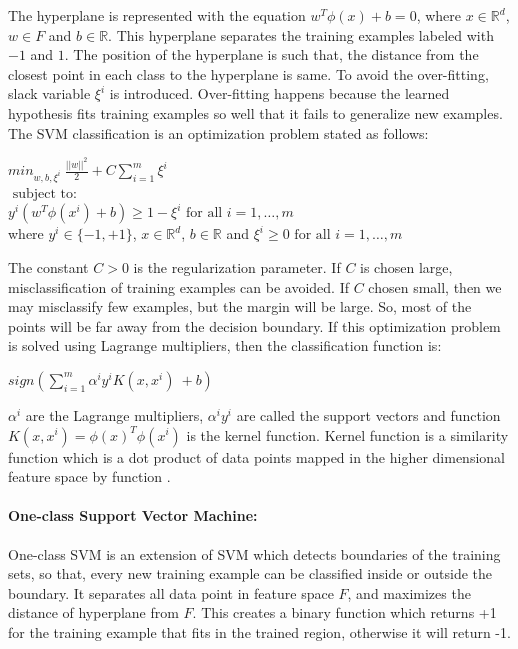 \documentclass[12pt,oneside,a4paper]{article}
\begin{document}
The hyperplane is represented with the equation $w^{T} \phi(x) + b = 0$, where $x \in \mathbb{R}^d$, $w \in F$ and $b \in \mathbb{R}$. This hyperplane separates the training examples labeled with $-1$ and $1$. The position of the hyperplane is such that, the distance from the closest point in each class to the hyperplane is same. To avoid the over-fitting, slack variable $\xi^{i}$ is introduced. Over-fitting happens because the learned hypothesis fits training examples so well that it fails to generalize new examples. The SVM classification is an optimization problem stated as follows:\cite{svm} \cite{svm-ml}

\begin{center}
  ${min}_{w,b,\xi^i} \ \frac{||w||^2}{2} + C \sum_{i=1}^m \xi^i$ \\
  $\mbox{ subject to: }$ \\
  $y^i( w^T \phi(x^i) + b) \geq 1 - \xi^i \mbox{ for all } i = 1, \dots, m$ \\
  where $y^{i} \in \{-1, +1\}$, $x \in \mathbb{R}^d$, $b \in \mathbb{R}$ and $\xi^i \geq 0 \mbox{ for all } i = 1, \dots, m$ \\
\end{center}

 The constant $C > 0$ is the regularization parameter. If $C$ is chosen large, misclassification of training examples can be avoided. If $C$ chosen small, then we may misclassify few examples, but the margin will be large. So, most of the points will be far away from the decision boundary. If this optimization problem is solved using Lagrange multipliers, then the classification function is:

\begin{center}
$sign(\sum_{i=1}^m \alpha^i y^i K(x,x^i) \ + b)$
\end{center}

$\alpha^i$ are the Lagrange multipliers, $\alpha^i y^i$ are called the support vectors and function $K(x,x^i) = \phi(x)^T \phi(x^i)$ is the kernel function. Kernel function is a similarity function which is a dot product of data points mapped in the higher dimensional feature space by function \Phi.

\paragraph{One-class Support Vector Machine:}

One-class SVM is an extension of SVM which detects boundaries of the training sets, so that, every new training example can be classified inside or outside the boundary. It separates all data point in feature space $F$, and maximizes the distance of hyperplane from $F$. This creates a binary function which returns +1 for the training example that fits in the trained region, otherwise it will return -1.
\end{document}
